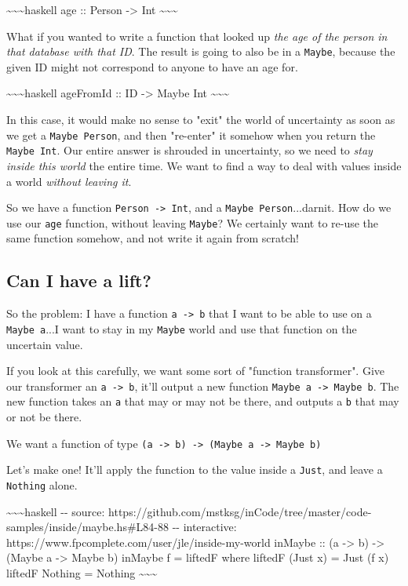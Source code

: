 \documentclass[]{article}
\begin{document}
\textasciitilde{}\textasciitilde{}\textasciitilde{}haskell age :: Person
-\textgreater{} Int \textasciitilde{}\textasciitilde{}\textasciitilde{}

What if you wanted to write a function that looked up \emph{the age of the
person in that database with that ID}. The result is going to also be in a
\texttt{Maybe}, because the given ID might not correspond to anyone to have an
age for.

\textasciitilde{}\textasciitilde{}\textasciitilde{}haskell ageFromId :: ID
-\textgreater{} Maybe Int \textasciitilde{}\textasciitilde{}\textasciitilde{}

In this case, it would make no sense to "exit" the world of uncertainty as soon
as we get a \texttt{Maybe\ Person}, and then "re-enter" it somehow when you
return the \texttt{Maybe\ Int}. Our entire answer is shrouded in uncertainty, so
we need to \emph{stay inside this world} the entire time. We want to find a way
to deal with values inside a world \emph{without leaving it}.

So we have a function \texttt{Person\ -\textgreater{}\ Int}, and a
\texttt{Maybe\ Person}...darnit. How do we use our \texttt{age} function,
without leaving \texttt{Maybe}? We certainly want to re-use the same function
somehow, and not write it again from scratch!

\subsection{Can I have a lift?}

So the problem: I have a function \texttt{a\ -\textgreater{}\ b} that I want to
be able to use on a \texttt{Maybe\ a}...I want to stay in my \texttt{Maybe}
world and use that function on the uncertain value.

If you look at this carefully, we want some sort of "function transformer". Give
our transformer an \texttt{a\ -\textgreater{}\ b}, it'll output a new function
\texttt{Maybe\ a\ -\textgreater{}\ Maybe\ b}. The new function takes an
\texttt{a} that may or may not be there, and outputs a \texttt{b} that may or
not be there.

We want a function of type
\texttt{(a\ -\textgreater{}\ b)\ -\textgreater{}\ (Maybe\ a\ -\textgreater{}\ Maybe\ b)}

Let's make one! It'll apply the function to the value inside a \texttt{Just},
and leave a \texttt{Nothing} alone.

\textasciitilde{}\textasciitilde{}\textasciitilde{}haskell -\/- source:
https://github.com/mstksg/inCode/tree/master/code-samples/inside/maybe.hs\#L84-88
-\/- interactive: https://www.fpcomplete.com/user/jle/inside-my-world inMaybe ::
(a -\textgreater{} b) -\textgreater{} (Maybe a -\textgreater{} Maybe b) inMaybe
f = liftedF where liftedF (Just x) = Just (f x) liftedF Nothing = Nothing
\textasciitilde{}\textasciitilde{}\textasciitilde{}
\end{document}
